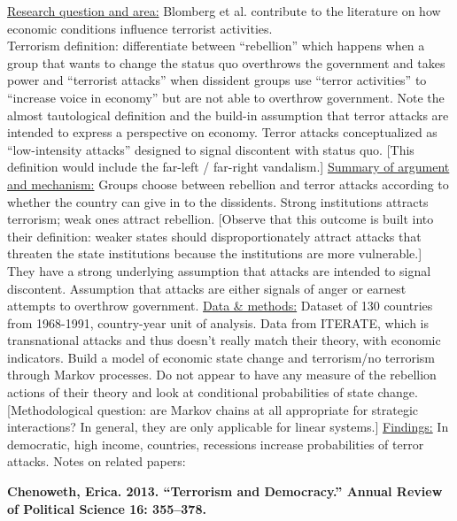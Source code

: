 \documentclass{article}[12pt]
\begin{document}
\underline{Research question and area:} Blomberg et al. contribute to the literature on how economic conditions influence terrorist activities.\\
Terrorism definition: differentiate between ``rebellion'' which happens when a group that wants to change the status quo overthrows the government and takes power and ``terrorist attacks'' when dissident groups use ``terror activities'' to ``increase voice in economy'' but are not able to overthrow government. Note the almost tautological definition and the build-in assumption that terror attacks are intended to express a perspective on economy. Terror attacks conceptualized as ``low-intensity attacks'' designed to signal discontent with status quo. [This definition would include the far-left / far-right vandalism.]
\underline{Summary of argument and mechanism:} Groups choose between rebellion and terror attacks according to whether the country can give in to the dissidents. Strong institutions attracts terrorism; weak ones attract rebellion. [Observe that this outcome is built into their definition: weaker states should disproportionately attract attacks that threaten the state institutions because the institutions are more vulnerable.] They have a strong underlying assumption that attacks are intended to signal discontent. Assumption that attacks are either signals of anger or earnest attempts to overthrow government.
\underline{Data \& methods:} Dataset of 130 countries from 1968-1991, country-year unit of analysis. Data from ITERATE, which is transnational attacks and thus doesn't really match their theory, with economic indicators. Build a model of economic state change and terrorism/no terrorism through Markov processes. Do not appear to have any measure of the rebellion actions of their theory and look at conditional probabilities of state change. [Methodological question: are Markov chains at all appropriate for strategic interactions? In general, they are only applicable for linear systems.]
\underline{Findings:} In democratic, high income, countries, recessions increase probabilities of terror attacks. 
Notes on related papers:


\textbf{Chenoweth, Erica. 2013. “Terrorism and Democracy.” Annual Review of Political Science 16: 355–378.}
\end{document}
